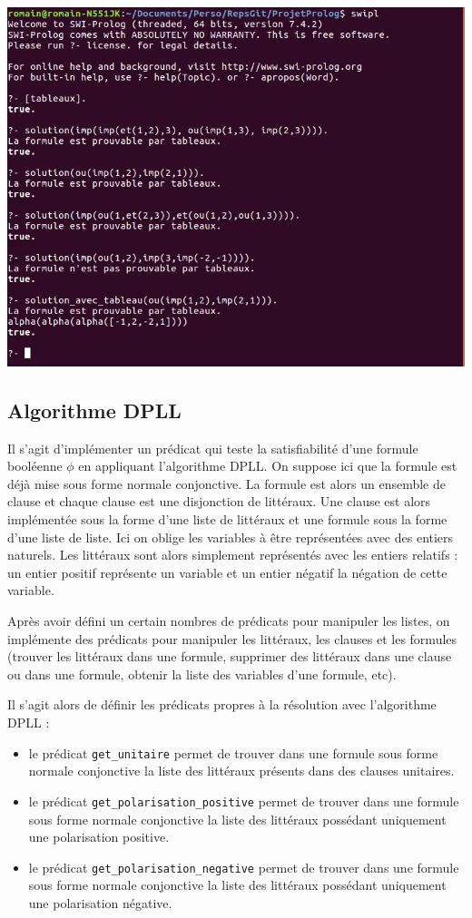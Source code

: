 \documentclass[12pt,a4paper]{article}
\begin{document}
\begin{center}
\includegraphics[width = 400pt]{SolutionTableaux.png}
\end{center}

\subsection{Algorithme DPLL}
Il s'agit d'implémenter un prédicat qui teste la satisfiabilité d'une formule booléenne $\phi$ en appliquant l'algorithme DPLL. On suppose ici que la formule est déjà mise sous forme normale conjonctive. La formule est alors un ensemble de clause et chaque clause est une disjonction de littéraux.  Une clause est alors implémentée sous la forme d'une liste de littéraux et une formule sous la forme d'une liste de liste. Ici on oblige les variables à être représentées avec des entiers naturels. Les littéraux sont alors simplement représentés avec les entiers relatifs : un entier positif représente un variable et un entier négatif la négation de cette variable.

Après avoir défini un certain nombres de prédicats pour manipuler les listes, on implémente des prédicats pour manipuler les littéraux, les clauses et les formules (trouver les littéraux dans une formule, supprimer des littéraux dans une clause ou dans une formule, obtenir la liste des variables d'une formule, etc).

Il s'agit alors de définir les prédicats propres à la résolution avec l'algorithme DPLL :
\begin{itemize}
\item le prédicat \texttt{get\_unitaire} permet de trouver dans une formule sous forme normale conjonctive la liste des littéraux présents dans des clauses unitaires.
\item le prédicat \texttt{get\_polarisation\_positive} permet de trouver dans une formule sous forme normale conjonctive la liste des littéraux possédant uniquement une polarisation positive.
\item le prédicat \texttt{get\_polarisation\_negative} permet de trouver dans une formule sous forme normale conjonctive la liste des littéraux possédant uniquement une polarisation négative.
\end{itemize}
\end{document}
